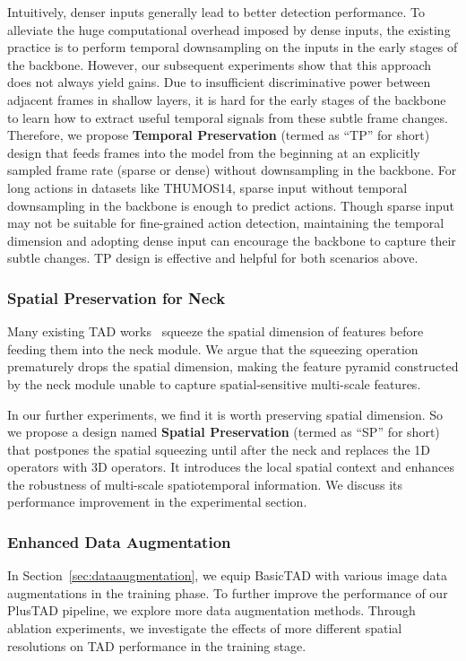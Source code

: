 \documentclass[a4paper,fleqn]{cas-dc}
\begin{document}
Intuitively, denser inputs generally lead to better detection performance. To alleviate the huge computational overhead imposed by dense inputs, the existing practice is to perform temporal downsampling on the inputs in the early stages of the backbone. However, our subsequent experiments show that this approach does not always yield gains. 
Due to insufficient discriminative power between adjacent frames in shallow layers, it is hard for the early stages of the backbone to learn how to extract useful temporal signals from these subtle frame changes. Therefore, we propose \textbf{Temporal Preservation} (termed as ``TP'' for short) design that feeds frames into the model from the beginning at an explicitly sampled frame rate (sparse or dense) without downsampling in the backbone.
For long actions in datasets like THUMOS14, sparse input without temporal downsampling in the backbone is enough to predict actions. Though sparse input may not be suitable for fine-grained action detection, maintaining the temporal dimension and adopting dense input can encourage the backbone to capture their subtle changes. TP design is effective and helpful for both scenarios above.




\subsubsection{Spatial Preservation for Neck}
\label{spatialpreservationforneck}
Many existing TAD works~\citep{afsd,rgb_enough} squeeze the spatial dimension of features before feeding them into the neck module. 
We argue that the squeezing operation prematurely drops the spatial dimension, making the feature pyramid constructed by the neck module unable to capture spatial-sensitive multi-scale features.

In our further experiments, we find it is worth preserving spatial dimension. 
So we propose a design named \textbf{Spatial Preservation} (termed as ``SP'' for short) that postpones the spatial squeezing until after the neck and replaces the 1D operators with 3D operators. 
It introduces the local spatial context and enhances the robustness of multi-scale spatiotemporal information. 
We discuss its performance improvement in the experimental section.
 


\subsubsection{Enhanced Data Augmentation} \label{detaileddataaugmentation}
In Section~\ref{sec:dataaugmentation}, we equip BasicTAD with various image data augmentations in the training phase.
To further improve the performance of our PlusTAD pipeline, we explore more data augmentation methods. Through ablation experiments, we investigate the effects of more different spatial resolutions on TAD performance in the training stage.
\end{document}
